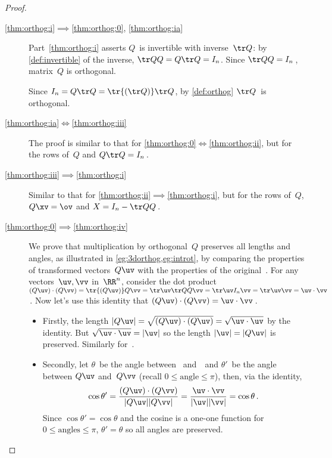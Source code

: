 \begin{proof}
\begin{description}
\item[\ref{thm:orthog:i}$\implies$\ref{thm:orthog:0}, \ref{thm:orthog:ia}]
Part~\ref{thm:orthog:i} asserts \(Q\)~is invertible with inverse~\(\tr Q\): by \cref{def:invertible} of the inverse, \(\tr QQ=Q\tr Q=I_n\).  
Since \(\tr QQ=I_n\)\,, matrix~\(Q\) is orthogonal.
 
Since \(I_n=Q\tr Q=\tr{(\tr Q)}\tr Q\), by \cref{def:orthog} \(\tr Q\)~is orthogonal.

\item[\ref{thm:orthog:ia}$\iff$\ref{thm:orthog:iii}] 
The proof is similar to that for \ref{thm:orthog:0}$\iff$\ref{thm:orthog:ii}, but for the rows of~\(Q\) and \(Q\tr Q=I_n\)\,.

\item[\ref{thm:orthog:iii}$\implies$\ref{thm:orthog:i}] 
Similar to that for \ref{thm:orthog:ii}$\implies$\ref{thm:orthog:i}, but for the rows of~\(Q\), \(Q\xv=\ov\) and \(X=I_n-\tr QQ\)\,.

\item[\ref{thm:orthog:0}$\implies$\ref{thm:orthog:iv}] 
We prove that multiplication by orthogonal~\(Q\) preserves all lengths and angles, as illustrated in \cref{eg:3dorthog,eg:introt}, by comparing the properties of transformed vectors~\(Q\uv\) with the properties of the original~\uv.
For any vectors~\(\uv,\vv\) in~\(\RR^n\), consider the dot product
\((Q\uv)\cdot(Q\vv)=\tr{(Q\uv)}Q\vv
=\tr\uv\tr QQ\vv
=\tr\uv I_n\vv
=\tr\uv\vv=\uv\cdot\vv\)\,.  
Now let's use this identity that \((Q\uv)\cdot(Q\vv)=\uv\cdot\vv\)\,.
\begin{itemize}
\item Firstly, the length \(|Q\uv|=\sqrt{(Q\uv)\cdot(Q\uv)}=\sqrt{\uv\cdot\uv}\) by the identity.  But \(\sqrt{\uv\cdot\uv}=|\uv|\) so the length \(|\uv|=|Q\uv|\) is preserved. 
Similarly for~\vv.
\item Secondly, let \(\theta\)~be the angle between \uv\ and~\vv\ and \(\theta'\)~be the angle between \(Q\uv\) and~\(Q\vv\) (recall \(0\leq\text{angle}\leq\pi\)), then, via the identity,
\begin{equation*}
\cos\theta'=\frac{(Q\uv)\cdot(Q\vv)}{|Q\uv||Q\vv|}
=\frac{\uv\cdot \vv}{|\uv||\vv|}
=\cos\theta\,.
\end{equation*}
Since \(\cos\theta'=\cos\theta\) and the cosine is a one-one function for \(0\leq\text{angles}\leq\pi\), \(\theta'=\theta\) so all angles are preserved.
\end{itemize}


\end{description}
\end{proof}

